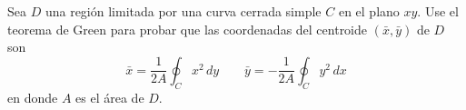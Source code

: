 \item Sea $D$ una región limitada por una curva cerrada simple $C$ en el plano $xy$. Use el teorema de Green para probar que las coordenadas del centroide $(\bar{x}, \bar{y})$ de $D$ son
    \[ \bar{x} = \frac{1}{2A} \oint_C x^2 \, dy \qquad \bar{y} = -\frac{1}{2A} \oint_C y^2 \, dx \]
    en donde $A$ es el área de $D$.
